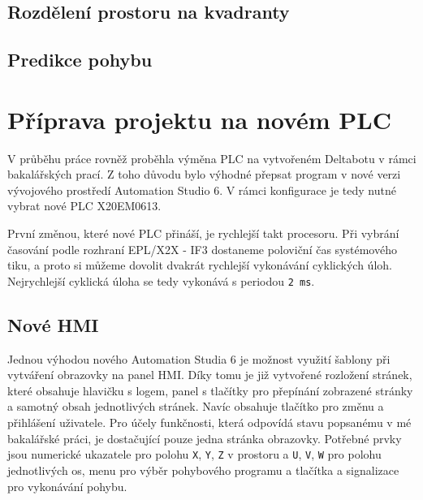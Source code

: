 

        
        

        \FloatBarrier

    \section{Rozdělení prostoru na kvadranty}

    \section{Predikce pohybu}







\chapter{Příprava projektu na novém PLC}
    V průběhu práce rovněž proběhla výměna PLC na vytvořeném Deltabotu v rámci bakalářských
    prací. Z toho důvodu bylo výhodné přepsat program v nové verzi vývojového prostředí 
    Automation Studio 6. V rámci konfigurace je tedy nutné vybrat nové PLC X20EM0613.
    
    První změnou, které nové PLC přináší, je rychlejší takt procesoru. Při vybrání časování
    podle rozhraní EPL/X2X - IF3 dostaneme poloviční čas systémového tiku, a proto si
    můžeme dovolit dvakrát rychlejší vykonávání cyklických úloh. Nejrychlejší cyklická úloha
    se tedy vykonává s periodou \texttt{2 ms}.

    \section{Nové HMI}
    Jednou výhodou nového Automation Studia 6 je možnost využití šablony při vytváření 
    obrazovky na panel HMI. Díky tomu je již vytvořené rozložení stránek, které obsahuje 
    hlavičku s logem, panel s tlačítky pro přepínání zobrazené stránky a samotný obsah 
    jednotlivých stránek. Navíc obsahuje tlačítko pro změnu a přihlášení uživatele.
    Pro účely funkčnosti, která odpovídá stavu popsanému v mé bakalářské práci, je 
    dostačující pouze jedna stránka obrazovky. Potřebné prvky jsou numerické ukazatele
    pro polohu \texttt{X}, \texttt{Y}, \texttt{Z} v prostoru a \texttt{U}, \texttt{V}, 
    \texttt{W} pro polohu jednotlivých os, menu pro výběr pohybového programu a tlačítka
    a signalizace pro vykonávání pohybu.
      
